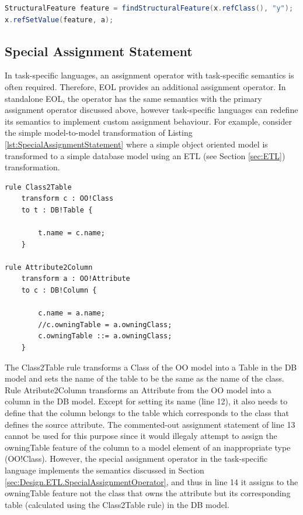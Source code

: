 \begin{lstlisting}[float=h, caption=Java code that assigns the value of a property of a model element that belongs to an MDR-based model, label=lst:MdrModelElementPropertyAssignment, language=Java]
StructuralFeature feature = findStructuralFeature(x.refClass(), "y");
x.refSetValue(feature, a);
\end{lstlisting}

\subsection{Special Assignment Statement}
\label{sec:Design.EOL.SpecialAssignmentStatement}
In task-specific languages, an assignment operator with task-specific semantics is often required. Therefore, EOL provides an additional assignment operator. In standalone EOL, the operator has the same semantics with the primary assignment operator discussed above, however task-specific languages can redefine its semantics to implement custom
assignment behaviour. For example, consider the simple model-to-model transformation of Listing \ref{lst:SpecialAssignmentStatement} where a simple object oriented model is transformed to a simple database model using an ETL (see Section \ref{sec:ETL}) transformation.

\begin{lstlisting}[float=h, caption=A simple model-to-model transformation
demonstrating the special assignment statement, label=lst:SpecialAssignmentStatement, language=ETL]
rule Class2Table
    transform c : OO!Class
    to t : DB!Table {
    
        t.name = c.name;
    }

rule Attribute2Column
    transform a : OO!Attribute
    to c : DB!Column {
    
        c.name = a.name;
        //c.owningTable = a.owningClass;
        c.owningTable ::= a.owningClass;
    }

\end{lstlisting}


The Class2Table rule transforms a Class of the OO model into a Table in the DB model and sets the name of the table to be the same as the name of the class. Rule Atribute2Column transforms an Attribute from the OO model into a column in the DB model. Except for setting its name (line 12), it also needs to define that the column belongs to the table which corresponds to the class that defines the source attribute. The commented-out assignment statement of line 13 cannot be used for this purpose since it would illegaly attempt to assign the owningTable feature of the column to a model element of an inappropriate type (OO!Class). However, the special assignment operator in the task-specific language implements the semantics discussed in Section \ref{sec:Design.ETL.SpecialAssignmentOperator}, and thus in line 14 it assigns to the owningTable feature not the class that owns the attribute but its corresponding table (calculated using the Class2Table rule) in the DB model. 



